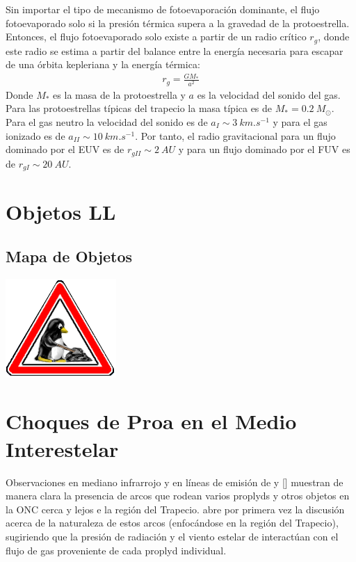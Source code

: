 Sin importar el tipo de mecanismo de fotoevaporación dominante, el flujo fotoevaporado solo si la presión térmica supera a la gravedad de la protoestrella. Entonces, el flujo fotoevaporado solo existe a partir de un radio crítico $r_g$, donde este radio se estima a partir del balance entre la energía necesaria para escapar de una órbita kepleriana y la energía térmica:
\begin{align}
  r_g = \frac{GM_*}{a^2}
\end{align}
Donde $M_*$ es la masa de la protoestrella y $a$ es la velocidad del sonido del gas. Para las protoestrellas típicas del trapecio la masa típica es de
$M_* = 0.2~M_\odot$. Para el gas neutro la velocidad del sonido es de $a_I \sim \SI{3}{km.s^{-1}}$ y para el gas ionizado es de $a_{II} \sim \SI{10}{km.s^{-1}}$.
Por tanto, el radio gravitacional para un flujo dominado por el EUV es de $r_{gII} \sim \SI{2}{AU}$ y para un flujo dominado por el FUV es de $r_{gI} \sim \SI{20}{AU}$.
\section{Objetos LL}
\subsection{Mapa de Objetos}
\includegraphics[width=0.1\linewidth]{./Figures/tux-development}

\section{Choques de Proa en el Medio Interestelar}

Observaciones en mediano infrarrojo y en líneas de emisión de  y [] \citep{Robberto:2005, Bally:1998, Bally:2000} muestran de manera clara la presencia de arcos que rodean varios proplyds y otros objetos en la ONC cerca y lejos e la región del Trapecio. \citet{Hayward:1994} abre por primera vez la discusión acerca de la naturaleza de estos arcos (enfocándose en la región del Trapecio), sugiriendo que la presión de radiación y el viento estelar de \thC{} interactúan con el flujo de gas proveniente de cada proplyd individual.

